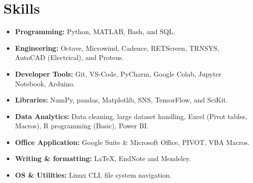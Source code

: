 \documentclass[a4paper,11pt]{article}
\begin{document}
\section{Skills}
\begin{minipage}[t]{\linewidth}
    \begin{itemize}[label=, nosep,after=\strut, leftmargin=0em, itemsep=2pt]
        \vspace{5pt}
        \item \textbf{Programming:} Python, MATLAB, Bash, and SQL.
        \item \textbf{Engineering:} Octave, Microwind, Cadence, RETScreen, TRNSYS, AutoCAD (Electrical), and Proteus. 
        \item \textbf{Developer Tools:} Git, VS-Code, PyCharm, Google Colab, Jupyter Notebook, Arduino.
        \item \textbf{Libraries:} NumPy, pandas, Matplotlib, SNS, TensorFlow, and SciKit.
        \item \textbf{Data Analytics:} Data cleaning, large dataset handling, Excel (Pivot tables, Macros), R programming (Basic), Power BI.
        \item \textbf{Office Application:} Google Suite \& Microsoft Office, PIVOT, VBA Macros.
        \item \textbf{Writing \& formatting:} \LaTeX, EndNote and Mendeley. 
        \item \textbf{OS \& Utilities:} Linux CLI, file system navigation.
        \end{itemize}
\end{minipage} 

\vspace{4mm}









\end{document}
